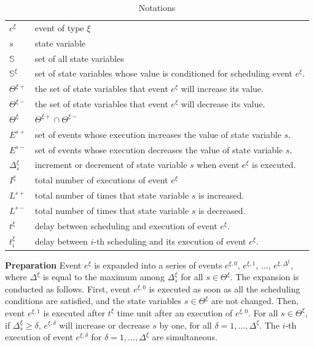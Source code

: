 \documentclass[]{interact}
\theoremstyle{plain}%
\theoremstyle{definition}
\theoremstyle{remark}
\begin{document}
\begin{table}[h]
	\begin{tabular}{ll}
		$e^{\xi}$ & event of type $\xi$\\
		$s$& state variable\\
		$\mathbb{S}$& set of all state variables\\
		$\mathbb{S}^{\xi}$  & set of state variables whose value is conditioned for scheduling event $e^{\xi}$.\\
		$\Theta^{\xi+}$ & the set of state variables that event $e^{\xi}$ will increase its value.\\
		$\Theta^{\xi-}$ & the set of state variables that event $e^{\xi}$ will decrease its value.\\
		$\Theta^{\xi}$ & $\Theta^{\xi+}\cap\Theta^{\xi-}$\\
		$E^{s+}$ & set of events whose execution increases the value of state variable $s$.\\
		$E^{s-}$  & set of events whose execution decreases the value of state variable $s$.\\
		$\Delta^{\xi}_s$ & increment or decrement of state variable $s$ when event $e^{\xi}$ is executed.\\
		$I^{\xi}$ & total number of executions of event $e^{\xi}$\\
		$L^{s+}$& total number of  times that state variable $s$ is increased.\\
		$L^{s-}$ & total number of  times that state variable $s$ is decreased.\\
		$t^{\xi}$ & delay between scheduling and execution of event $e^{\xi}$.\\
		$t^{\xi}_i$ & delay between $i$-th scheduling and its execution of event $e^{\xi}$.\\
	\end{tabular}
\caption{Notations}
\end{table}


\textbf{Preparation} Event $e^{\xi}$ is expanded into a series of events $e^{\xi,0}$, $e^{\xi,1}$, ..., $e^{\xi,\Delta^{\xi}}$, where $\Delta^{\xi}$ is equal to the maximum among $\Delta^{\xi}_s$ for all $s\in \Theta^{\xi}$. The expansion is conducted as follows. First, event $e^{\xi,0}$ is executed as soon as all the scheduling conditions are satisfied, and the state variables $s\in \Theta^{\xi}$ are not changed. Then, event $e^{\xi,1}$ is executed after $t^{\xi}$ time unit after an execution of $e^{\xi,0}$. For all $s\in \Theta^{\xi}$, if $\Delta^{\xi}_s\ge \delta$,  $e^{\xi,\delta}$ will increase or decrease $s$ by one, for all $\delta=1,...,\Delta^{\xi}$. The $i$-th execution of event $e^{\xi,\delta}$ for $\delta=1,...,\Delta^{\xi}$ are simultaneous.
\end{document}
